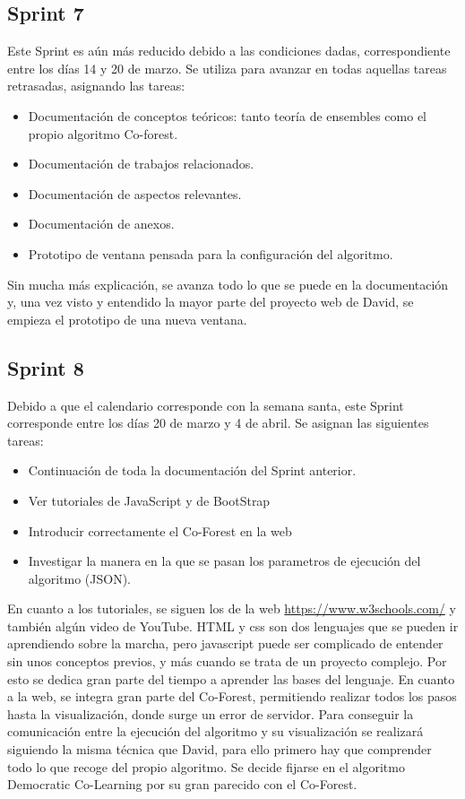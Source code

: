 \subsection{Sprint 7}
Este Sprint es aún más reducido debido a las condiciones dadas, correspondiente entre los días 14 y 20 de marzo. Se utiliza para avanzar en todas aquellas tareas retrasadas, asignando las tareas:
\begin{itemize}
	\item Documentación de conceptos teóricos: tanto teoría de ensembles como el propio algoritmo Co-forest.
	\item Documentación de trabajos relacionados.
	\item Documentación de aspectos relevantes.
	\item Documentación de anexos.
	\item Prototipo de ventana pensada para la configuración del algoritmo.
	
\end{itemize}
Sin mucha más explicación, se avanza todo lo que se puede en la documentación y, una vez visto y entendido la mayor parte del proyecto web de David, se empieza el prototipo de una nueva ventana.

\subsection{Sprint 8}
Debido a que el calendario corresponde con la semana santa, este Sprint corresponde entre los días 20 de marzo y 4 de abril. Se asignan las siguientes tareas:
 \begin{itemize}
 	\item Continuación de toda la documentación del Sprint anterior.
 	\item Ver tutoriales de JavaScript y de BootStrap
 	\item Introducir correctamente el Co-Forest en la web
 	\item Investigar la manera en la que se pasan los parametros de ejecución del algoritmo (JSON).
 	
 \end{itemize}
En cuanto a los tutoriales, se siguen los de la web \url{https://www.w3schools.com/} y también algún video de YouTube. HTML y css son dos lenguajes que se pueden ir aprendiendo sobre la marcha, pero javascript puede ser complicado de entender sin unos conceptos previos, y más cuando se trata de un proyecto complejo. Por esto se dedica gran parte del tiempo a aprender las bases del lenguaje. 
En cuanto a la web, se integra gran parte del Co-Forest, permitiendo realizar todos los pasos hasta la visualización, donde surge un error de servidor.
Para conseguir la comunicación entre la ejecución del algoritmo y su visualización se realizará siguiendo la misma técnica que David, para ello primero hay que comprender todo lo que recoge del propio algoritmo. Se decide fijarse en el algoritmo Democratic Co-Learning por su gran parecido con el Co-Forest.

